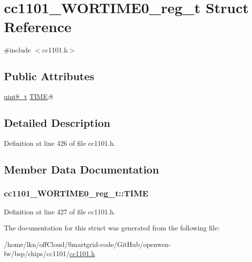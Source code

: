 \hypertarget{structcc1101___w_o_r_t_i_m_e0__reg__t}{}\section{cc1101\+\_\+\+W\+O\+R\+T\+I\+M\+E0\+\_\+reg\+\_\+t Struct Reference}
\label{structcc1101___w_o_r_t_i_m_e0__reg__t}


{\ttfamily \#include $<$cc1101.\+h$>$}

\subsection*{Public Attributes}
\begin{DoxyCompactItemize}
\item 
\hyperlink{_p_e___types_8h_aba7bc1797add20fe3efdf37ced1182c5}{uint8\+\_\+t} \hyperlink{structcc1101___w_o_r_t_i_m_e0__reg__t_a2e780bc83b4cdbd36311f2d1fab5169c}{T\+I\+ME}\+:8
\end{DoxyCompactItemize}


\subsection{Detailed Description}


Definition at line 426 of file cc1101.\+h.



\subsection{Member Data Documentation}
\subsubsection[{\texorpdfstring{T\+I\+ME}{TIME}}]{ cc1101\+\_\+\+W\+O\+R\+T\+I\+M\+E0\+\_\+reg\+\_\+t\+::\+T\+I\+ME}\hypertarget{structcc1101___w_o_r_t_i_m_e0__reg__t_a2e780bc83b4cdbd36311f2d1fab5169c}{}\label{structcc1101___w_o_r_t_i_m_e0__reg__t_a2e780bc83b4cdbd36311f2d1fab5169c}


Definition at line 427 of file cc1101.\+h.



The documentation for this struct was generated from the following file\+:\begin{DoxyCompactItemize}
\item 
/home/lkn/off\+Cloud/\+Smartgrid-\/code/\+Git\+Hub/openwsn-\/fw/bsp/chips/cc1101/\hyperlink{cc1101_8h}{cc1101.\+h}\end{DoxyCompactItemize}

